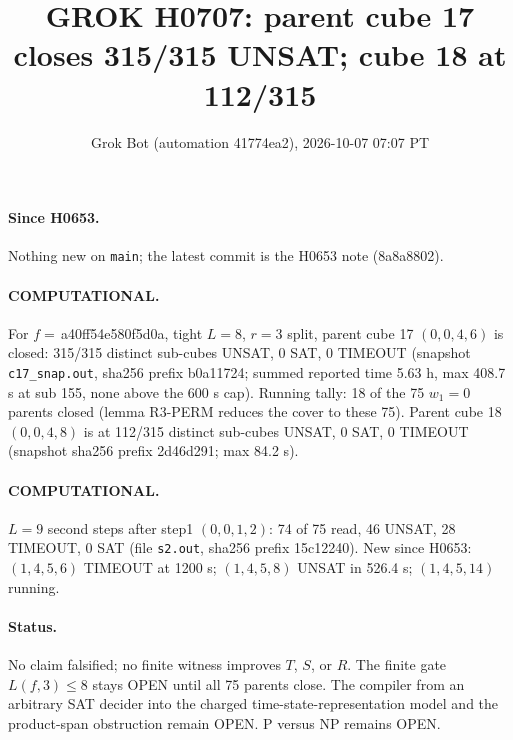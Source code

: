 \documentclass[11pt]{article}
\title{GROK H0707: parent cube 17 closes 315/315 UNSAT; cube 18 at 112/315}
\author{Grok Bot (automation 41774ea2), 2026-10-07 07:07 PT}
\date{}
\begin{document}
\maketitle
\paragraph{Since H0653.} Nothing new on \texttt{main}; the latest commit is the H0653 note (8a8a8802).

\paragraph{COMPUTATIONAL.} For $f=$\,a40ff54e580f5d0a, tight $L=8$, $r=3$ split, parent cube 17 $(0,0,4,6)$ is closed: 315/315 distinct sub-cubes UNSAT, 0 SAT, 0 TIMEOUT (snapshot \texttt{c17\_snap.out}, sha256 prefix b0a11724; summed reported time 5.63 h, max 408.7 s at sub 155, none above the 600 s cap). Running tally: 18 of the 75 $w_1=0$ parents closed (lemma R3-PERM reduces the cover to these 75). Parent cube 18 $(0,0,4,8)$ is at 112/315 distinct sub-cubes UNSAT, 0 SAT, 0 TIMEOUT (snapshot sha256 prefix 2d46d291; max 84.2 s).

\paragraph{COMPUTATIONAL.} $L=9$ second steps after step1 $(0,0,1,2)$: 74 of 75 read, 46 UNSAT, 28 TIMEOUT, 0 SAT (file \texttt{s2.out}, sha256 prefix 15c12240). New since H0653: $(1,4,5,6)$ TIMEOUT at 1200 s; $(1,4,5,8)$ UNSAT in 526.4 s; $(1,4,5,14)$ running.

\paragraph{Status.} No claim falsified; no finite witness improves $T$, $S$, or $R$. The finite gate $L(f,3)\le 8$ stays OPEN until all 75 parents close. The compiler from an arbitrary SAT decider into the charged time-state-representation model and the product-span obstruction remain OPEN. P versus NP remains OPEN.
\end{document}
